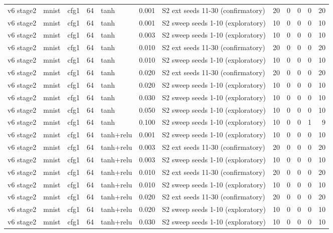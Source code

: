 \begin{table}[htbp]
{\begin{tabular}{@{}lllrlrlrrrrr@{}}
v6 stage2 & mnist & cfg1 & 64 & tanh & 0.001 & S2 ext seeds 11-30 (confirmatory) & 20 & 0 & 0 & 0 & 20 \\
v6 stage2 & mnist & cfg1 & 64 & tanh & 0.001 & S2 sweep seeds 1-10 (exploratory) & 10 & 0 & 0 & 0 & 10 \\
v6 stage2 & mnist & cfg1 & 64 & tanh & 0.003 & S2 sweep seeds 1-10 (exploratory) & 10 & 0 & 0 & 0 & 10 \\
v6 stage2 & mnist & cfg1 & 64 & tanh & 0.010 & S2 ext seeds 11-30 (confirmatory) & 20 & 0 & 0 & 0 & 20 \\
v6 stage2 & mnist & cfg1 & 64 & tanh & 0.010 & S2 sweep seeds 1-10 (exploratory) & 10 & 0 & 0 & 0 & 10 \\
v6 stage2 & mnist & cfg1 & 64 & tanh & 0.020 & S2 ext seeds 11-30 (confirmatory) & 20 & 0 & 0 & 0 & 20 \\
v6 stage2 & mnist & cfg1 & 64 & tanh & 0.020 & S2 sweep seeds 1-10 (exploratory) & 10 & 0 & 0 & 0 & 10 \\
v6 stage2 & mnist & cfg1 & 64 & tanh & 0.030 & S2 sweep seeds 1-10 (exploratory) & 10 & 0 & 0 & 0 & 10 \\
v6 stage2 & mnist & cfg1 & 64 & tanh & 0.050 & S2 sweep seeds 1-10 (exploratory) & 10 & 0 & 0 & 0 & 10 \\
v6 stage2 & mnist & cfg1 & 64 & tanh & 0.100 & S2 sweep seeds 1-10 (exploratory) & 10 & 0 & 0 & 1 & 9 \\
v6 stage2 & mnist & cfg1 & 64 & tanh+relu & 0.001 & S2 sweep seeds 1-10 (exploratory) & 10 & 0 & 0 & 0 & 10 \\
v6 stage2 & mnist & cfg1 & 64 & tanh+relu & 0.003 & S2 ext seeds 11-30 (confirmatory) & 20 & 0 & 0 & 0 & 20 \\
v6 stage2 & mnist & cfg1 & 64 & tanh+relu & 0.003 & S2 sweep seeds 1-10 (exploratory) & 10 & 0 & 0 & 0 & 10 \\
v6 stage2 & mnist & cfg1 & 64 & tanh+relu & 0.010 & S2 ext seeds 11-30 (confirmatory) & 20 & 0 & 0 & 0 & 20 \\
v6 stage2 & mnist & cfg1 & 64 & tanh+relu & 0.010 & S2 sweep seeds 1-10 (exploratory) & 10 & 0 & 0 & 0 & 10 \\
v6 stage2 & mnist & cfg1 & 64 & tanh+relu & 0.020 & S2 ext seeds 11-30 (confirmatory) & 20 & 0 & 0 & 0 & 20 \\
v6 stage2 & mnist & cfg1 & 64 & tanh+relu & 0.020 & S2 sweep seeds 1-10 (exploratory) & 10 & 0 & 0 & 0 & 10 \\
v6 stage2 & mnist & cfg1 & 64 & tanh+relu & 0.030 & S2 sweep seeds 1-10 (exploratory) & 10 & 0 & 0 & 0 & 10 \\

\end{tabular}}
\end{table}
